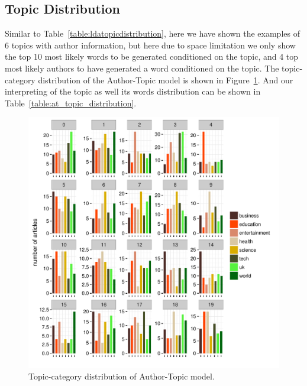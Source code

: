 \subsection{Topic Distribution}\label{at_dat_td}


Similar to Table~\ref{table:ldatopicdistribution}, here we have shown the examples of 6 topics with author information, but here due to space limitation we only show the top 10 most likely words to be generated conditioned on the topic, and 4 top most likely authors to have generated a word conditioned on the topic. The topic-category distribution of the Author-Topic model is shown in Figure~\ref{fig:at_topic_category}. And our interpreting of the topic as well its words distribution can be shown in Table~\ref{table:at_topic_distribution}. 

\begin{figure}[h]
\centering
\includegraphics[width=1\textwidth]{figures/at_topic_category.pdf}
\caption{Topic-category distribution of Author-Topic model.}
\label{fig:at_topic_category}
\end{figure}


